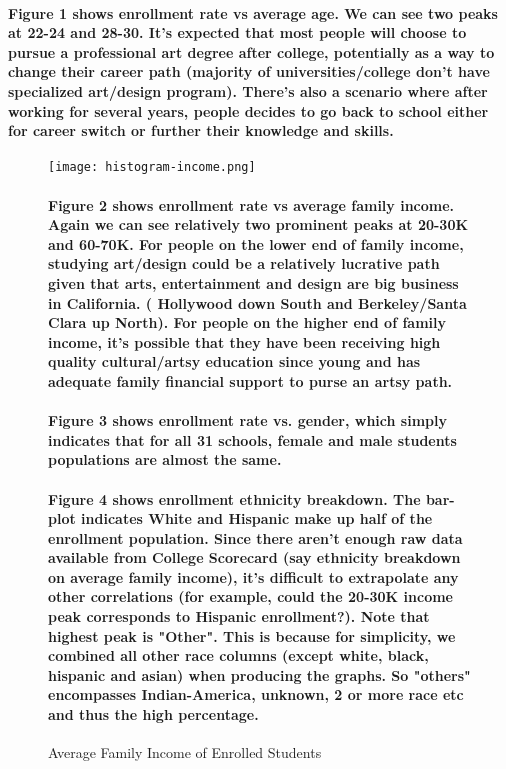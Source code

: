  \paragraph{Figure 1 shows enrollment rate vs average age. We can see two peaks at 22-24 and 28-30. It's expected that most people will choose to pursue a professional art degree after college, potentially as a way to change their career path (majority of universities/college don't have specialized art/design program). There's also a scenario where after working for several years, people decides to go back to school either for career switch or further their knowledge and skills.} 

 \begin{figure}
\centering
\texttt{[image: histogram-income.png]}
\caption{Average Family Income of Enrolled Students}

\paragraph{ Figure 2 shows enrollment rate vs average family income. Again we can see relatively two prominent peaks at 20-30K and 60-70K.  For people on the lower end of family income, studying art/design could be a relatively lucrative path given that arts, entertainment and design are big business in California. ( Hollywood down South and Berkeley/Santa Clara up North). For people on the higher end of family income, it's possible that they have been receiving high quality cultural/artsy education since young and has adequate family financial support to purse an artsy path.}

 \paragraph{ Figure 3 shows enrollment rate vs. gender, which simply indicates that for all 31 schools, female and male students populations are almost the same. }

\paragraph{Figure 4 shows enrollment ethnicity breakdown. The bar-plot indicates White and Hispanic make up half of the enrollment population. Since there aren't enough raw data available from College Scorecard (say ethnicity breakdown on average family income), it's difficult to extrapolate any other correlations (for example, could the 20-30K income peak corresponds to Hispanic enrollment?). Note that highest peak is "Other". This is because for simplicity, we combined all other race columns (except white, black, hispanic and asian) when producing the graphs. So "others" encompasses Indian-America, unknown, 2 or more race etc and thus the high percentage. }
  

\end{figure}
